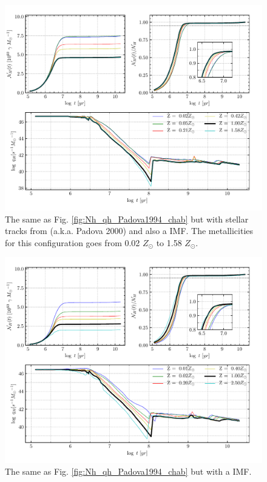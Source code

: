 \documentclass[12pt,letterpaper,usenatbib,useAMS]{article}
\begin{document}
\begin{figure}
    \includegraphics[width=\textwidth]{figs/Nh_logt_metBase_Padova2000_chab.pdf}
    \caption{The same as Fig. \ref{fig:Nh_qh_Padova1994_chab} but with stellar tracks from \citep{Girardi.etal.2000a} (a.k.a. Padova 2000) and also a \citet{Chabrier.2003a} IMF. The metallicities for this configuration goes from 0.02 $Z_\odot$ to 1.58 $Z_\odot$.}
    \label{fig:Nh_qh_Padova2000_chab}
\end{figure}

\begin{figure}
    \includegraphics[width=\textwidth]{figs/Nh_logt_metBase_Padova1994_salp.pdf}
    \caption{The same as Fig. \ref{fig:Nh_qh_Padova1994_chab} but with a \citet{Salpeter.1955a} IMF.}
    \label{fig:Nh_qh_Padova1994_salp}
\end{figure}
\end{document}
